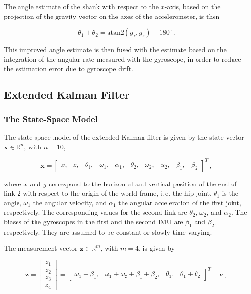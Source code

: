 \noindent
The angle estimate of the shank with respect to the $x$-axis, based on the projection of the gravity vector on the axes of the accelerometer, is then

\begin{equation}
  \theta_1 + \theta_2 = \mbox{atan}2(g_z, g_x)-180^{\circ}\,.
\end{equation}

\noindent
This improved angle estimate is then fused with the estimate based on the integration of the angular rate measured with the gyroscope, in order to reduce the estimation error due to gyroscope drift.

\subsection{Extended Kalman Filter} \label{sec:EKF_model}

\subsubsection{The State-Space Model}

The state-space model of the extended Kalman filter is given by the state vector $\mathbf{x} \in \mathbb{R}^{n}$, with $n=10$,

\begin{equation} \label{eq:state_vector}
  \mathbf{x} = \begin{bmatrix}
  	x, & z, & \theta_1, & \omega_1, & \alpha_1, & \theta_2, & \omega_2, & \alpha_2, & \beta_1, & \beta_2
  \end{bmatrix}^T\,,
\end{equation}

\noindent
where $x$ and $y$ correspond to the horizontal and vertical position of the end of link $2$ with respect to the origin of the world frame, i.\,e. the hip joint. $\theta_1$ is the angle, $\omega_1$ the angular velocity, and $\alpha_1$ the angular acceleration of the first joint, respectively. The corresponding values for the second link are $\theta_2$, $\omega_2$, and $\alpha_2$. The biases of the gyroscopes in the first and the second IMU are $\beta_1$ and $\beta_2$, respectively. They are assumed to be constant or slowly time-varying.

The measurement vector $\mathbf{z} \in \mathbb{R}^m$, with $m = 4$, is given by

\begin{equation} \label{eq:measurement_vector}
  \mathbf{z} = \begin{bmatrix} z_1 \\ z_2 \\ z_3 \\ z_4 \end{bmatrix} = \begin{bmatrix}
  	\omega_1 + \beta_1, & \omega_1 + \omega_2 + \beta_1 + \beta_2, & \theta_1, & \theta_1 + \theta_2
  \end{bmatrix}^T + \mathbf{v}\,,
\end{equation}
 
